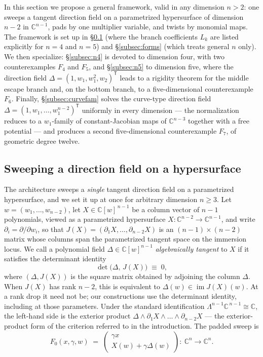 \documentclass[11pt]{article}
\numberwithin{equation}{section}
\theoremstyle{plain}
\theoremstyle{definition}
\theoremstyle{remark}
\newcommand{\C}{\mathbb{C}}
\begin{document}
In this section we propose a general framework, valid in any dimension $n>2$:
one sweeps a tangent direction field on a parametrized hypersurface of dimension
$n-2$ in $\C^{n-1}$, pads by one multiplier variable, and twists by monomial
maps. The framework is set up in \S\ref{subsec:sweephyp} (where the branch
coefficients $L_k$ are listed explicitly for $n=4$ and $n=5$) and
\S\ref{subsec:forms} (which treats general $n$ only). We then specialize:
\S\ref{subsec:n4} is devoted to dimension four, with two counterexamples
$F_4$ and $F_5$, and \S\ref{subsec:n5} to dimension five, where the direction
field $\Delta=(1,w_1,w_1^2,w_2)^{\mathsf T}$ leads to a rigidity theorem for the middle
escape branch and, on the bottom branch, to a five-dimensional counterexample
$F_6$. Finally, \S\ref{subsec:curvefam} solves the curve-type direction field
$\Delta=(1,w_1,\dots,w_1^{n-2})^{\mathsf T}$ uniformly in every dimension --- the
normalization reduces to a $w_1$-family of constant-Jacobian maps of
$\C^{n-3}$ together with a free potential --- and produces a second
five-dimensional counterexample $F_7$, of geometric degree twelve.

\subsection{Sweeping a direction field on a hypersurface}\label{subsec:sweephyp}
The architecture sweeps a \emph{single} tangent direction field on a
parametrized hypersurface, and we set it up at once for arbitrary dimension
$n\ge3$. Let $w=(w_1,\dots,w_{n-2})$, let $X\in\C[w]^{\,n-1}$ be a column vector
of $n-1$ polynomials, viewed as a parametrized hypersurface
$X\colon\C^{n-2}\to\C^{n-1}$, and write $\partial_i=\partial/\partial w_i$, so
that $J(X)=(\partial_1X,\dots,\partial_{n-2}X)$ is an
$(n-1)\times(n-2)$ matrix whose columns span the parametrized tangent space on the
immersion locus. We call a polynomial field $\Delta\in\C[w]^{n-1}$
\emph{algebraically tangent} to $X$ if it satisfies the determinant identity
\begin{equation}\label{eq:tangcrit}
\det\bigl(\Delta,\,J(X)\bigr)\;\equiv\;0 ,
\end{equation}
where $(\Delta,J(X))$ is the square matrix obtained by adjoining the column
$\Delta$. When $J(X)$ has rank $n-2$, this is equivalent to
$\Delta(w)\in\operatorname{im}J(X)(w)$. At a rank drop it need not be;
our constructions use the determinant identity, including at those parameters. Under the standard identification
$\Lambda^{n-1}\C^{\,n-1}\cong\C$, the left-hand side is the exterior product
$\Delta\wedge\partial_1X\wedge\dots\wedge\partial_{n-2}X$ --- the
exterior-product form of the criterion referred to in the introduction. The padded sweep is
\[
F_0(x,\gamma,w)\;=\;\begin{pmatrix}\gamma x\\ X(w)+\gamma\Delta(w)\end{pmatrix}\colon
\ \C^n\to\C^n .
\]
\end{document}
